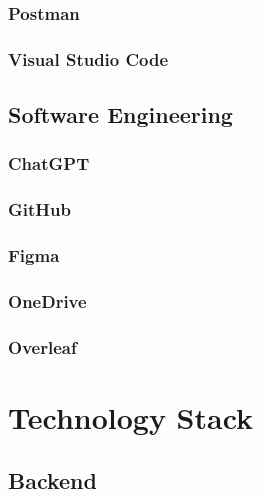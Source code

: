 \subsubsection*{Postman}



\subsubsection*{Visual Studio Code}



\subsection{Software Engineering}

\subsubsection*{ChatGPT}



\subsubsection*{GitHub}



\subsubsection*{Figma}



\subsubsection*{OneDrive}



\subsubsection*{Overleaf}



\section{Technology Stack}



\subsection{Backend}


